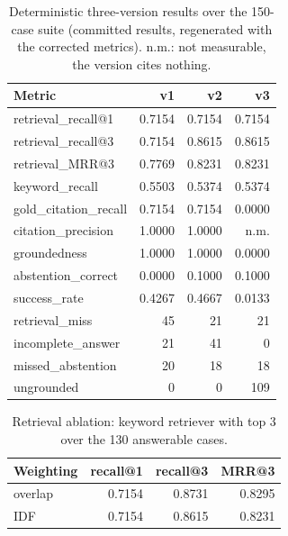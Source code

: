 \documentclass[conference]{IEEEtran}
\begin{document}
\begin{table}[t]
\centering
\caption{Deterministic three-version results over the 150-case suite
(committed results, regenerated with the corrected metrics). n.m.: not
measurable, the version cites nothing.}
\label{tab:versions}
\small
\begin{tabular}{@{}lrrr@{}}
\toprule
Metric & v1 & v2 & v3 \\
\midrule
retrieval\_recall@1 & 0.7154 & 0.7154 & 0.7154 \\
retrieval\_recall@3 & 0.7154 & 0.8615 & 0.8615 \\
retrieval\_MRR@3 & 0.7769 & 0.8231 & 0.8231 \\
keyword\_recall & 0.5503 & 0.5374 & 0.5374 \\
gold\_citation\_recall & 0.7154 & 0.7154 & 0.0000 \\
citation\_precision & 1.0000 & 1.0000 & n.m. \\
groundedness & 1.0000 & 1.0000 & 0.0000 \\
abstention\_correct & 0.0000 & 0.1000 & 0.1000 \\
success\_rate & 0.4267 & 0.4667 & 0.0133 \\
\midrule
retrieval\_miss & 45 & 21 & 21 \\
incomplete\_answer & 21 & 41 & 0 \\
missed\_abstention & 20 & 18 & 18 \\
ungrounded & 0 & 0 & 109 \\
\bottomrule
\end{tabular}
\end{table}

\begin{table}[t]
\centering
\caption{Retrieval ablation: keyword retriever with top 3 over the 130
answerable cases.}
\label{tab:ablation}
\small
\begin{tabular}{@{}lrrr@{}}
\toprule
Weighting & recall@1 & recall@3 & MRR@3 \\
\midrule
overlap & 0.7154 & 0.8731 & 0.8295 \\
IDF & 0.7154 & 0.8615 & 0.8231 \\
\bottomrule
\end{tabular}
\end{table}
\end{document}
